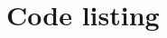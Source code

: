 \documentclass[a4paper, 11pt, notitlepage,english]{article}
\begin{document}


\section*{Code listing}


 
 

\end{document}
